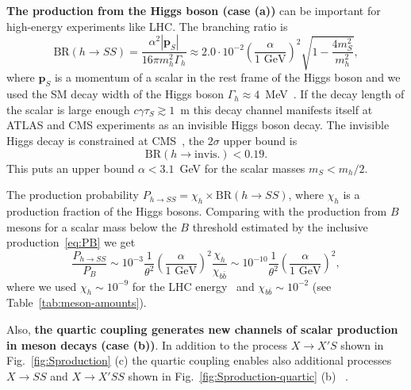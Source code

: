 \documentclass[a4paper,12pt,dvipsnames,usernames]{article}
\begin{document}
\textbf{The production from the Higgs boson (case (a))} can be important for high-energy experiments like LHC. The branching ratio is
\begin{equation}
    \text{BR}(h\to S S) = \frac{\alpha^2|\bm{p}_S|}{16\pi m_h^2 \Gamma_h} \approx 2.0\cdot 10^{-2}\left(\frac{\alpha}{1\text{ GeV}}\right)^{2}\sqrt{1 - \frac{4m_{S}^{2}}{m_{h}^{2}}},
    \label{eq:BR-h-to-SS}
\end{equation}
where $\bm{p}_S$ is a momentum of a scalar in the rest frame of the Higgs boson and we used the SM decay width of the Higgs boson $\Gamma_h \approx 4$~MeV~\cite{Denner:2011mq}. If the decay length of the scalar is large enough $c\gamma\tau_S \gtrsim 1$~m this decay channel manifests itself at ATLAS and CMS experiments as an invisible Higgs boson decay. The invisible Higgs decay is constrained at CMS~\cite{Sirunyan:2018owy}, the $2\sigma$ upper bound is
\begin{equation}
    \text{BR}(h \to \text{invis.}) < 0.19.
    \label{eq:higgs_inv}
\end{equation}
This puts an upper bound $\alpha< 3.1$~GeV for the scalar masses $m_S < m_h/2$.

The  production probability $P_{h\to SS} = \chi_h \times \text{BR}(h\to S S)$, where $\chi_h$ is a production fraction of the Higgs bosons. Comparing with the production from $B$ mesons for a scalar mass below the $B$ threshold estimated by the  inclusive production~\eqref{eq:PB} we get
\begin{equation}
    \frac{P_{h\to SS}}{P_B} \sim 10^{-3} \frac{1}{\theta^2} \left(\frac{\alpha}{1\text{ GeV}}\right)^{2} \frac{\chi_h}{\chi_{b\bar{b}}}
    \sim 10^{-10} \frac{1}{\theta^2} \left(\frac{\alpha}{1\text{ GeV}}\right)^{2},
    \label{eq:Pss-to-PB}
\end{equation}
where we used $\chi_{h}\sim 10^{-9}$ for the LHC energy~\cite{Heinemeyer:2013tqa} and $\chi_{b\bar{b}} \sim 10^{-2}$ (see Table~\ref{tab:meson-amounts}).

Also, \textbf{the quartic coupling generates new channels of scalar production in meson decays (case (b))}.
In addition to the process $X\to X'S$ shown in Fig.~\ref{fig:Sproduction} (c) the quartic coupling enables also additional processes $X\to SS$ and  $X\to X'SS$ shown in Fig.~\ref{fig:Sproduction-quartic} (b) ~\cite{Bird:2004ts,Bird:2006jd,Kim:2009qc,He:2010nt,Batell:2009jf,Badin:2010uh}.
\end{document}

